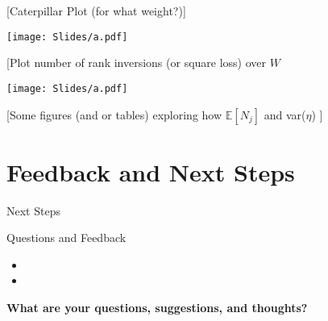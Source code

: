 \documentclass[t,aspectratio=169,11pt]{beamer}
\newenvironment{wideitemize}{\itemize\addtolength{\itemsep}{14pt}}{\enditemize}
\begin{document}
\begin{frame}{[Caterpillar Plot (for what weight?)]}

\centering
{}
\texttt{[image: Slides/a.pdf]}

\end{frame}


\begin{frame}{[Plot number of rank inversions (or square loss) over $W$}

\centering
{}
\texttt{[image: Slides/a.pdf]}

\end{frame}


\begin{frame}{[Some figures (and or tables) exploring how $\mathbb{E}[N_j]$ and var($\eta$) ]}

\centering


\end{frame}
\section{Feedback and Next Steps}

\begin{frame}{Next Steps}

\begin{wideitemize}
    \item 
\end{wideitemize}

\end{frame}


\begin{frame}{Questions and Feedback}

\begin{wideitemize}
    \item 
    \item<2-> 
    \begin{itemize}
        \item 
        \item 
    \end{itemize}
    \item<3-> 
    \vspace{12pt}
    \item<4-> \textbf{What are your questions, suggestions, and thoughts?} 
    

\end{wideitemize}

\end{frame}
\end{document}
